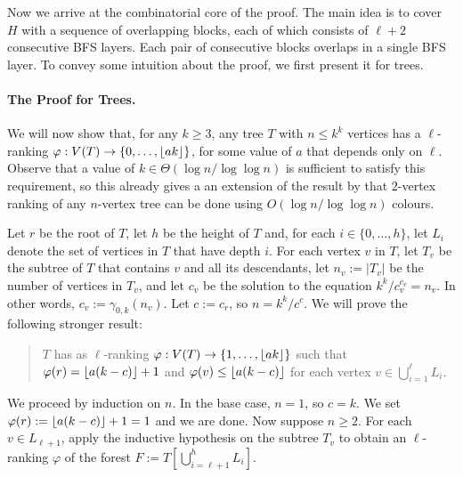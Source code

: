 \documentclass[kpfonts]{patmorin}
\theoremstyle{named}
\begin{document}
Now we arrive at the combinatorial core of the proof. The main idea is to cover $H$ with a sequence of overlapping blocks, each of which consists of $\ell+2$ consecutive BFS layers.  Each pair of consecutive blocks overlaps in a single BFS layer. To convey some intuition about the proof, we first present it for trees.

\paragraph{The Proof for Trees.}

We will now show that, for any $k\ge 3$, any tree $T$ with $n \le k^k$ vertices has a $\ell$-ranking $\varphi:V(T)\to\{0,\ldots,{\lfloor ak \rfloor}\}$, for some value of $a$ that depends only on $\ell$.  Observe that a value of $k\in\Theta(\log n/\log\log n)$ is sufficient to satisfy this requirement, so this already gives a an extension of the result by \citet{karpas.neiman.ea:on} that $2$-vertex ranking of any $n$-vertex tree can be done using $O(\log n/\log\log n)$ colours.

Let $r$ be the root of $T$, let $h$ be the height of $T$ and, for each $i\in\{0,\ldots,h\}$, let $L_i$ denote the set of vertices in $T$ that have depth $i$.  For each vertex $v$ in $T$, let $T_v$ be the subtree of $T$ that contains $v$ and all its descendants, let $n_v:=|T_v|$ be the number of vertices in $T_v$, and let $c_v$ be the solution to the equation $k^k/c_v^{c_v} = n_v$.  In other words, $c_v:=\gamma_{0,k}(n_v)$.  Let $c:=c_r$, so $n=k^k/c^c$.  We will prove the following stronger result:

\begin{quote}
    $T$ has as $\ell$-ranking $\varphi:V(T)\to\{1,\ldots,{\lfloor ak \rfloor}\}$ such that $\varphi(r)={\lfloor a(k-c) \rfloor}+1$ and $\varphi(v)\le {\lfloor a(k-c) \rfloor}$ for each vertex $v\in\bigcup_{i=1}^\ell L_i$.
\end{quote}

We proceed by induction on $n$. In the base case, $n=1$, so $c=k$.  We set $\varphi(r):={\lfloor a(k-c) \rfloor}+1=1$ and we are done. Now suppose $n\ge 2$.  For each $v\in L_{\ell+1}$, apply the inductive hypothesis on the subtree $T_v$ to obtain an $\ell$-ranking $\varphi$ of the forest $F:=T[\bigcup_{i=\ell+1}^h L_i]$.
\end{document}

